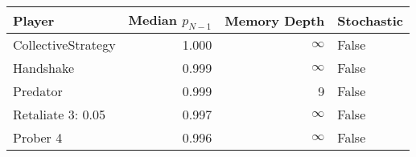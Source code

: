 \begin{tabular}{lrrl}
\toprule
             Player &  Median $p_{N-1}$ &  Memory Depth & Stochastic \\
\midrule
 CollectiveStrategy &             1.000 &            \(\infty\) &      False \\
          Handshake &             0.999 &            \(\infty\) &      False \\
           Predator &             0.999 &             9 &      False \\
  Retaliate 3: 0.05 &             0.997 &            \(\infty\) &      False \\
           Prober 4 &             0.996 &            \(\infty\) &      False \\
\bottomrule
\end{tabular}

